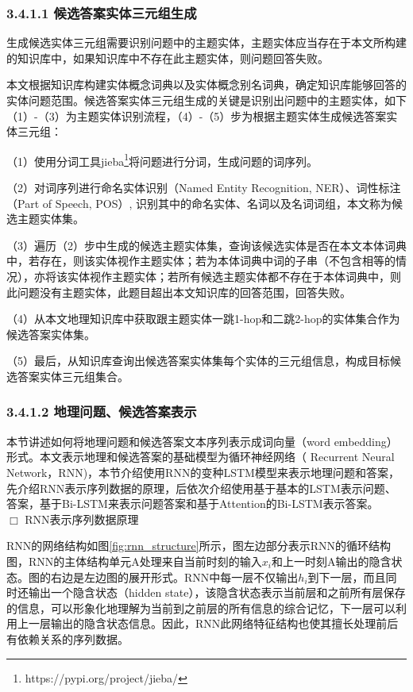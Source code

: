 \subsubsection{3.4.1.1 候选答案实体三元组生成}
生成候选实体三元组需要识别问题中的主题实体，主题实体应当存在于本文所构建的知识库中，如果知识库中不存在此主题实体，则问题回答失败。

本文根据知识库构建实体概念词典以及实体概念别名词典，确定知识库能够回答的实体问题范围。候选答案实体三元组生成的关键是识别出问题中的主题实体，如下（1）-（3）为主题实体识别流程，（4）-（5）步为根据主题实体生成候选答案实体三元组：

（1）使用分词工具jieba\footnote{https://pypi.org/project/jieba/}将问题进行分词，生成问题的词序列。

（2）对词序列进行命名实体识别（Named Entity Recognition, NER）、词性标注（Part  of  Speech, POS）, 识别其中的命名实体、名词以及名词词组，本文称为候选主题实体集。

（3）遍历（2）步中生成的候选主题实体集，查询该候选实体是否在本文本体词典中，若存在，则该实体视作主题实体；若为本体词典中词的子串（不包含相等的情况），亦将该实体视作主题实体；若所有候选主题实体都不存在于本体词典中，则此问题没有主题实体，此题目超出本文知识库的回答范围，回答失败。

（4）从本文地理知识库中获取跟主题实体一跳1-hop和二跳2-hop的实体集合作为候选答案实体集。

（5）最后，从知识库查询出候选答案实体集每个实体的三元组信息，构成目标候选答案实体三元组集合。


\subsubsection{3.4.1.2 地理问题、候选答案表示}
本节讲述如何将地理问题和候选答案文本序列表示成词向量（word embedding）形式。本文表示地理和候选答案的基础模型为循环神经网络（ Recurrent Neural Network，RNN)，本节介绍使用RNN的变种LSTM模型来表示地理问题和答案，先介绍RNN表示序列数据的原理，后依次介绍使用基于基本的LSTM表示问题、答案，基于Bi-LSTM来表示问题答案和基于Attention的Bi-LSTM表示答案。
\\

$\Box$ RNN表示序列数据原理

RNN的网络结构如图\ref{fig:rnn_structure}所示，图左边部分表示RNN的循环结构图，RNN的主体结构单元A处理来自当前时刻的输入$x_{i}$和上一时刻A输出的隐含状态。图的右边是左边图的展开形式。RNN中每一层不仅输出$h_{i}$到下一层，而且同时还输出一个隐含状态（hidden state），该隐含状态表示当前层和之前所有层保存的信息，可以形象化地理解为当前到之前层的所有信息的综合记忆，下一层可以利用上一层输出的隐含状态信息。因此，RNN此网络特征结构也使其擅长处理前后有依赖关系的序列数据。

